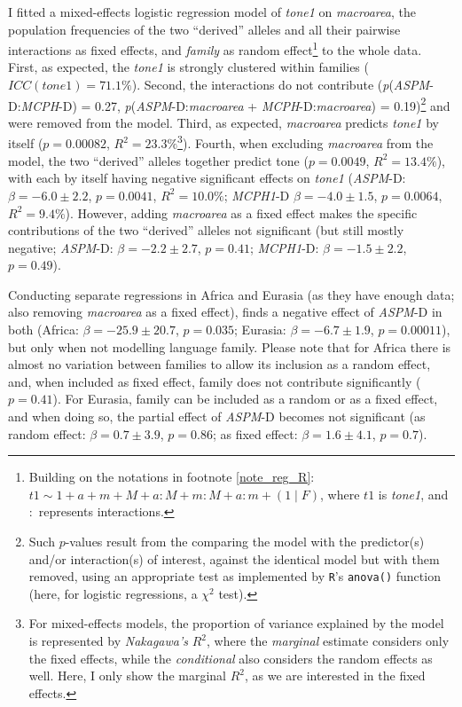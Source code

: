 \documentclass[twoside,twocolumn]{article}
\begin{document}
I fitted a mixed-effects logistic regression model of \textit{tone1} on \textit{macroarea}, the population frequencies of the two ``derived'' alleles and all their pairwise interactions as fixed effects, and \textit{family} as random effect\footnote{Building on the notations in footnote \ref{note_reg_R}: $t1 \sim 1 + a + m +  M + a:M + m:M + a:m + (1 \mid F)$, where $t1$ is \textit{tone1}, and $:$ represents interactions.} to the whole data.
First, as expected, the \textit{tone1} is strongly clustered within families ($ICC(tone1) = 71.1\%$).
Second, the interactions do not contribute (\textit{p}(\textit{ASPM}-D:\textit{MCPH}-D) = 0.27, \textit{p}(\textit{ASPM}-D:\textit{macroarea} + \textit{MCPH}-D:\textit{macroarea}) = 0.19)\footnote{Such $p$-values result from the comparing the model with the predictor(s) and/or interaction(s) of interest, against the identical model but with them removed, using an appropriate test as implemented by \texttt{R}'s \texttt{anova()} function (here, for logistic regressions, a $\chi^2$ test).} and were removed from the model.
Third, as expected, \textit{macroarea} predicts \textit{tone1} by itself ($p = 0.00082$, $R^2 = 23.3\%$\footnote{For mixed-effects models, the proportion of variance explained by the model is represented by \emph{Nakagawa's} $R^2$, where the \emph{marginal} estimate considers only the fixed effects, while the \emph{conditional} also considers the random effects as well. Here, I only show the marginal $R^2$, as we are interested in the fixed effects.}).
Fourth, when excluding \textit{macroarea} from the model, the two ``derived'' alleles together predict tone ($p = 0.0049$, $R^2 = 13.4\%$), with each by itself having negative significant effects on \textit{tone1} (\textit{ASPM}-D: $\beta = -6.0 \pm 2.2$, $p = 0.0041$, $R^2 = 10.0\%$; \textit{MCPH1}-D $\beta = -4.0 \pm 1.5$, $p = 0.0064$, $R^2 = 9.4\%$).
However, adding \textit{macroarea} as a fixed effect makes the specific contributions of the two ``derived'' alleles not significant (but still mostly negative;  \textit{ASPM}-D: $\beta = -2.2 \pm 2.7$, $p = 0.41$; \textit{MCPH1}-D: $\beta = -1.5 \pm 2.2$, $p = 0.49$).

Conducting separate regressions in Africa and Eurasia (as they have enough data; also removing \textit{macroarea} as a fixed effect), finds a negative effect of \textit{ASPM}-D in both (Africa: $\beta = -25.9 \pm 20.7$, $p = 0.035$; Eurasia: $\beta = -6.7 \pm 1.9$, $p = 0.00011$), but only when not modelling language family.
Please note that for Africa there is almost no variation between families to allow its inclusion as a random effect, and, when included as fixed effect, family does not contribute significantly ($p = 0.41$).
For Eurasia, family can be included as a random or as a fixed effect, and when doing so, the partial effect of \textit{ASPM}-D becomes not significant (as random effect: $\beta = 0.7 \pm 3.9$, $p = 0.86$; as fixed effect: $\beta = 1.6 \pm 4.1$, $p = 0.7$).
\end{document}
